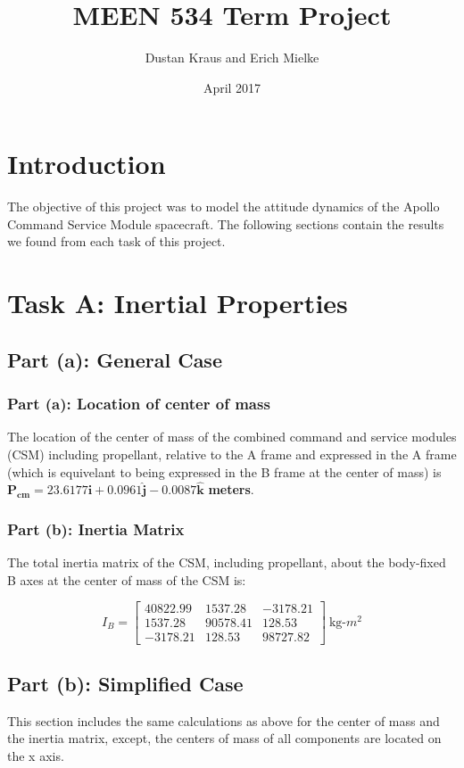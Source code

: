\documentclass{article}
\title{MEEN 534 Term Project}
\author{Dustan Kraus and Erich Mielke}
\date{April 2017}
\begin{document}
\maketitle

\section{Introduction}
The objective of this project was to model the attitude dynamics of the Apollo Command Service Module spacecraft. The following sections contain the results we found from each task of this project.

\section{Task A: Inertial Properties}
\subsection{Part (a): General Case}
\subsubsection{Part (a): Location of center of mass}
The location of the center of mass of the combined command and service modules (CSM) including propellant, relative to the A frame and expressed in the A frame (which is equivelant to being expressed in the B frame at the center of mass) is $\mathbf{P_{cm} = 23.6177\hat{i} + 0.0961\hat{j} - 0.0087\hat{k}}$ \textbf{meters}.

\subsubsection{Part (b): Inertia Matrix}
The total inertia matrix of the CSM, including propellant, about the body-fixed B axes at the center of mass of the CSM is: 

\[
I_B=
  \begin{bmatrix}
    40822.99 & 1537.28 & -3178.21 \\
    1537.28 & 90578.41 & 128.53 \\
    -3178.21 & 128.53 & 98727.82
  \end{bmatrix} \:\text{kg-$m^2$}
\]

\subsection{Part (b): Simplified Case}
This section includes the same calculations as above for the center of mass and the inertia matrix, except, the centers of mass of all components are located on the x axis.
\end{document}
